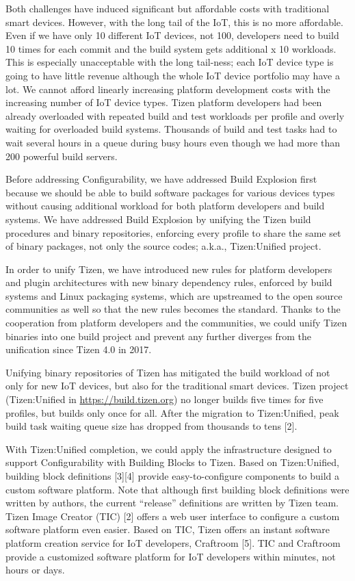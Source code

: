 Both challenges have induced significant but affordable costs with traditional smart devices. However, with the long tail of the IoT, this is no more affordable. Even if we have only 10 different IoT devices, not 100, developers need to build 10 times for each commit and the build system gets additional x 10 workloads. This is especially unacceptable with the long tail-ness; each IoT device type is going to have little revenue although the whole IoT device portfolio may have a lot. We cannot afford linearly increasing platform development costs with the increasing number of IoT device types. Tizen platform developers had been already overloaded with repeated build and test workloads per profile and overly waiting for overloaded build systems. Thousands of build and test tasks had to wait several hours in a queue during busy hours even though we had more than 200 powerful build servers.


Before addressing Configurability, we have addressed Build Explosion first because we should be able to build software packages for various devices types without causing additional workload for both platform developers and build systems. We have addressed Build Explosion by unifying the Tizen build procedures and binary repositories, enforcing every profile to share the same set of binary packages, not only the source codes; a.k.a., Tizen:Unified project.


In order to unify Tizen, we have introduced new rules for platform developers and plugin architectures with new binary dependency rules, enforced by build systems and Linux packaging systems, which are upstreamed to the open source communities as well so that the new rules becomes the standard. Thanks to the cooperation from platform developers and the communities, we could unify Tizen binaries into one build project and prevent any further diverges from the unification since Tizen 4.0 in 2017.


Unifying binary repositories of Tizen has mitigated the build workload of not only for new IoT devices, but also for the traditional smart devices. Tizen project (Tizen:Unified in \url{https://build.tizen.org}) no longer builds five times for five profiles, but builds only once for all. After the migration to Tizen:Unified, peak build task waiting queue size has dropped from thousands to tens [2].


With Tizen:Unified completion, we could apply the infrastructure designed to support Configurability with Building Blocks to Tizen. Based on Tizen:Unified, building block definitions [3][4] provide easy-to-configure components to build a custom software platform. Note that although first building block definitions were written by authors, the current “release” definitions are written by Tizen team. Tizen Image Creator (TIC) [2] offers a web user interface to configure a custom software platform even easier. Based on TIC, Tizen offers an instant software platform creation service for IoT developers, Craftroom [5]. TIC and Craftroom provide a customized software platform for IoT developers within minutes, not hours or days.



